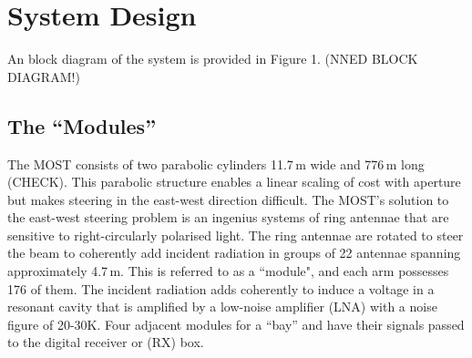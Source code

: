 \section{System Design}

An block diagram of the system is provided in Figure 1. (NNED BLOCK DIAGRAM!)

\subsection{The ``Modules''}
The MOST consists of two parabolic cylinders 11.7\,m wide and 776\,m long (CHECK). This parabolic structure enables a linear scaling of cost with aperture but makes steering in the east-west direction difficult. The MOST's solution to the east-west steering problem is an ingenius systems of ring antennae that are sensitive to right-circularly polarised light. The ring antennae are rotated to steer the beam to coherently add incident radiation in groups of 22 antennae spanning approximately 4.7\,m. This is referred to as a ``module", and each arm possesses 176 of them.
The incident radiation adds coherently to induce a voltage in a resonant cavity that is amplified by a low-noise amplifier (LNA) with a noise figure of 20-30K. Four adjacent modules for a ``bay'' and have their signals passed to the digital receiver or (RX) box.
